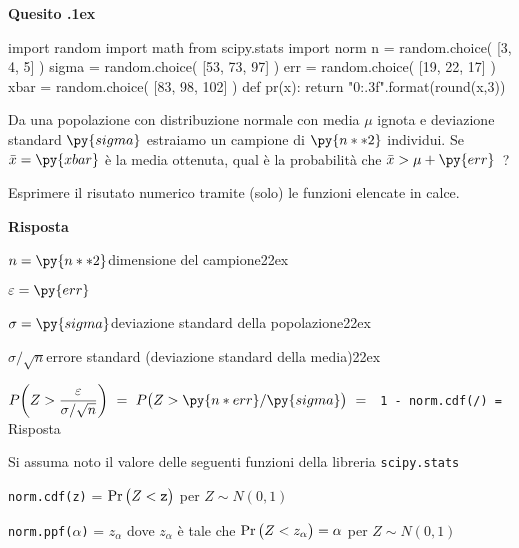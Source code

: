 \documentclass[11pt,twoside,a4paper]{article}
\def\Pr{{\rm Pr\,}}
\newcounter{quesito}
\newenvironment{question}{\addtocounter{quesito}{1}\bigskip\bigskip\par\textbf{Quesito \thequesito.\kern1ex}}{\vspace{\parskip}}
\newenvironment{answer}{\par\textbf{Risposta\quad}}{\vspace{\parskip}}
\begin{document}
\begin{question} %
\begin{pycode}
import random
import math
from scipy.stats import norm
n = random.choice( [3, 4, 5] )
sigma = random.choice( [53, 73, 97] )
err = random.choice( [19, 22, 17] )
xbar = random.choice( [83, 98, 102] )
def pr(x):
    return "{0:.3f}".format(round(x,3))

\end{pycode}
Da una popolazione con distribuzione normale con media $\mu$ ignota e deviazione standard $\py{sigma}$ estraiamo un campione di $\py{n**2}$ individui. Se $\bar x= \py{xbar}$ è la media ottenuta, qual è la probabilità che $\bar x>\mu+ \py{err}$~? 
    
Esprimere il risutato numerico tramite (solo) le funzioni elencate in calce.

\begin{answer}
  
  $n = \py{n**2}$\hfill dimensione del campione\kern22ex
  
  $\varepsilon = \py{err}$ 
  
  $\sigma = \py{sigma}$\hfill deviazione standard della popolazione\kern22ex
  
  $\sigma/\sqrt{n}$\hfill errore standard (deviazione standard della media)\kern22ex
  
  $P\bigg(Z>\dfrac {\varepsilon}{\sigma/\sqrt{n}}\bigg)\ =\ P\big(Z>\py{n * err}/\py{sigma}\big)\ =\ ${\color{blue}\tt\ 1 - norm.cdf(/)}{\tt\ =  }{\color{blue}\hfill Risposta}

\end{answer}
\end{question}


\vfill
\hrulefill

Si assuma noto il valore delle seguenti funzioni della libreria {\tt scipy.stats\/}

{\tt norm.cdf(z)} = $\Pr\big(Z<{\tt z}\big)$ per $Z\sim N(0,1)$ 

{\tt norm.ppf($\alpha$)} = $z_\alpha$ dove $z_\alpha$ è tale che $\Pr\big(Z<z_\alpha\big)=\alpha$ per $Z\sim N(0,1)$ 
\end{document}
